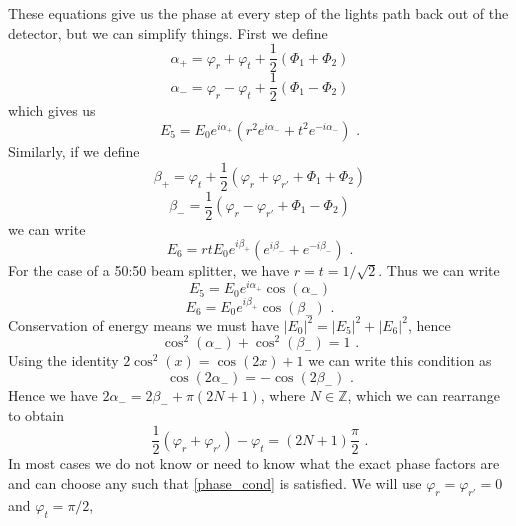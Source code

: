 \documentclass[11pt]{cuthesis}
\newcommand{\fs}{\text{ .}}
\begin{document}
These equations give us the phase at every step of the lights path back out of the detector, but we can simplify things. First we define 
\begin{equation}
\alpha_+ = \varphi_r + \varphi_t + \frac{1}{2}(\Phi_1+\Phi_2)
\end{equation}
\begin{equation}
\alpha_- = \varphi_r - \varphi_t + \frac{1}{2}(\Phi_1- \Phi_2)
\end{equation}
which gives us 
\begin{equation}
E_5=E_0 e^{i \alpha_+}(r^2 e^{i \alpha_-}+t^2 e^{-i \alpha_-}) \fs
\end{equation}
Similarly, if we define
\begin{equation}
\beta_+ = \varphi_t +\frac{1}{2}(\varphi_r+\varphi_{r'}+\Phi_1+\Phi_2)	
\end{equation}
\begin{equation}
\beta_-=\frac{1}{2}(\varphi_r-\varphi_{r'}+\Phi_1-\Phi_2) 
\end{equation}
we can write 
\begin{equation}
E_6=r t E_0 e^{i \beta_+}( e^{i \beta_-}+ e^{-i \beta_-}) \fs
\end{equation}
For the case of a 50:50 beam splitter, we have $r=t=1/\sqrt{2}$. Thus we can write
\begin{equation}
E_5=E_0 e^{i\alpha_+} \cos(\alpha_-)
\end{equation}
\begin{equation}
E_6=E_0 e^{i\beta_+} \cos(\beta_-) \fs
\end{equation}
Conservation of energy means we must have $|E_0|^2=|E_5|^2+|E_6|^2$, hence
\begin{equation}
\cos^2(\alpha_-)+\cos^2(\beta_-)=1 \fs
\end{equation}
Using the identity $2\cos^2(x)=\cos(2x)+1$ we can write this condition as
\begin{equation}
\cos(2\alpha_-)=-\cos(2\beta_-) \fs
\end{equation}
Hence we have $2\alpha_-=2\beta_- +\pi(2N+1)$, where $N\in \mathbb{Z}$, which we can rearrange to obtain
\begin{equation} \label{phase_cond}
\frac{1}{2}(\varphi_r+\varphi_{r'})-\varphi_t=(2N+1)\frac{\pi}{2} \fs
\end{equation}
In most cases we do not know or need to know what the exact phase factors are and can choose any such that \ref{phase_cond} is satisfied. We will use $\varphi_r=\varphi_{r'}=0$ and $\varphi_t=\pi/2$, %
\end{document}
